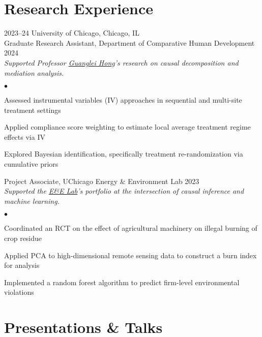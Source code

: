 \documentclass[11pt,letterpaper]{report}
\newenvironment{list2}{
  \begin{list}{\tiny$\bullet$}{%
      \setlength{\itemsep}{0in}
      \setlength{\parsep}{0in} \setlength{\parskip}{0in}
      \setlength{\topsep}{0in} \setlength{\partopsep}{0in} 
      \setlength{\leftmargin}{0.2in}}}{\end{list}}
\begin{document}
\section*{Research Experience}

\begin{tablist}
\item[2023--24] \tab{}University of Chicago, Chicago, IL\\ 
Graduate Research Assistant, Department of Comparative Human Development \hfill 2024\\  
\emph{Supported Professor \href{https://voices.uchicago.edu/ghong/}{Guanglei Hong}'s research on causal decomposition and mediation analysis.}

\vspace*{.05in}  
\begin{list2}
\item Assessed instrumental variables (IV) approaches in sequential and multi-site treatment settings 
\item Applied compliance score weighting to estimate local average treatment regime effects via IV
\item Explored Bayesian identification, specifically treatment re-randomization via cumulative priors 
\end{list2}

\vspace*{.1in}
Project Associate, UChicago Energy \& Environment Lab \hfill 2023\\  
\emph{Supported the \href{https://urbanlabs.uchicago.edu/labs/energy-environment}{E\&E Lab}'s portfolio at the intersection of causal inference and machine learning.}

\vspace*{.05in}  
\begin{list2}
\item Coordinated an RCT on the effect of agricultural machinery on illegal burning of crop residue
\item Applied PCA to high-dimensional remote sensing data to construct a burn index for analysis
\item Implemented a random forest algorithm to predict firm-level environmental violations
\end{list2}
\end{tablist}

\section*{Presentations \& Talks}
\end{document}
